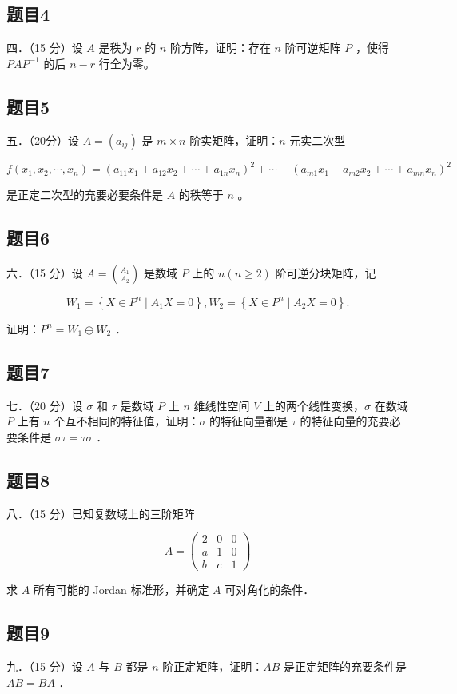 \documentclass{article}
\begin{document}
\subsection{题目4}
四．（15 分）设 \(A\) 是秩为 \(r\) 的 \(n\) 阶方阵，证明：存在 \(n\) 阶可逆矩阵 \(P\) ，使得 \(P A P^{-1}\) 的后 \(n-r\) 行全为零。

\subsection{题目5}
五．（20分）设 \(A=\left(a_{i j}\right)\) 是 \(m \times n\) 阶实矩阵，证明：\(n\) 元实二次型

\[
f\left(x_{1}, x_{2}, \cdots, x_{n}\right)=\left(a_{11} x_{1}+a_{12} x_{2}+\cdots+a_{1 n} x_{n}\right)^{2}+\cdots+\left(a_{m 1} x_{1}+a_{m 2} x_{2}+\cdots+a_{m n} x_{n}\right)^{2}
\]

是正定二次型的充要必要条件是 \(A\) 的秩等于 \(n\) 。

\subsection{题目6}
六．（15 分）设 \(A=\binom{A_{1}}{A_{2}}\) 是数域 \(P\) 上的 \(n(n \geq 2)\) 阶可逆分块矩阵，记

\[
W_{1}=\left\{X \in P^{n} \mid A_{1} X=0\right\}, W_{2}=\left\{X \in P^{n} \mid A_{2} X=0\right\} .
\]

证明：\(P^{n}=W_{1} \oplus W_{2}\) ．

\subsection{题目7}
七．（20 分）设 \(\sigma\) 和 \(\tau\) 是数域 \(P\) 上 \(n\) 维线性空间 \(V\) 上的两个线性变换，\(\sigma\) 在数域 \(P\) 上有 \(n\) 个互不相同的特征值，证明：\(\sigma\) 的特征向量都是 \(\tau\) 的特征向量的充要必要条件是 \(\sigma \tau=\tau \sigma\) ．

\subsection{题目8}
八．（15 分）已知复数域上的三阶矩阵

\[
A=\left(\begin{array}{lll}
2 & 0 & 0 \\
a & 1 & 0 \\
b & c & 1
\end{array}\right)
\]

求 \(A\) 所有可能的 Jordan 标准形，并确定 \(A\) 可对角化的条件．

\subsection{题目9}
九．（15 分）设 \(A\) 与 \(B\) 都是 \(n\) 阶正定矩阵，证明：\(A B\) 是正定矩阵的充要条件是 \(A B=B A\) ．
\end{document}
